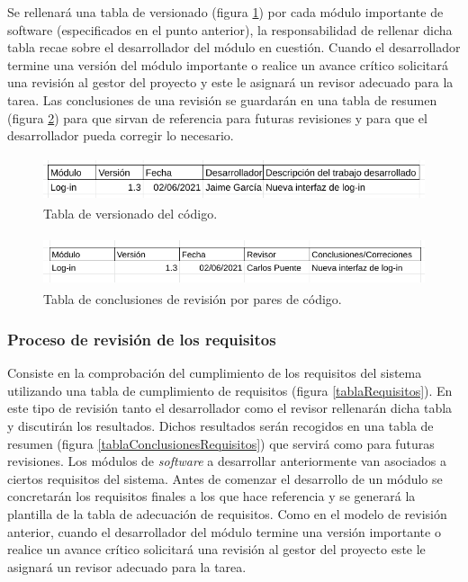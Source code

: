 \documentclass{article}
\begin{document}
Se rellenará una tabla de versionado (figura \ref{tablaVersionado}) por cada módulo importante de software (especificados en el punto anterior), la responsabilidad de rellenar dicha tabla recae sobre el desarrollador del módulo en cuestión. Cuando el desarrollador termine una versión del módulo importante o realice un avance crítico solicitará una revisión al gestor del proyecto y este le asignará un revisor adecuado para la tarea. Las conclusiones de una revisión se guardarán en una tabla de resumen (figura \ref{tablaConclusionesPares}) para que sirvan de referencia para futuras revisiones y para que el desarrollador pueda corregir lo necesario.

\begin{figure}[H]
   \centering
       \includegraphics[height=1.3cm]{../images/tabla_versionado_code.png}
   \caption{Tabla de versionado del código.}
   \label{tablaVersionado}
\end{figure}

\begin{figure}[H]
   \centering
       \includegraphics[height=1.5cm]{../images/tabla_conclusiones_revision_pares.png}
   \caption{Tabla de conclusiones de revisión por pares de código.}
   \label{tablaConclusionesPares}
\end{figure}

\subsubsection{Proceso de revisión de los requisitos} \label{P.EC.13}

Consiste en la comprobación del cumplimiento de los requisitos del sistema utilizando una tabla de cumplimiento de requisitos (figura \ref{tablaRequisitos}). En este tipo de revisión tanto el desarrollador como el revisor rellenarán dicha tabla y discutirán los resultados. Dichos resultados serán recogidos en una tabla de resumen (figura \ref{tablaConclusionesRequisitos}) que servirá como para futuras revisiones. Los módulos de \textit{software} a desarrollar anteriormente van asociados a ciertos requisitos del sistema. Antes de comenzar el desarrollo de un módulo se concretarán los requisitos finales a los que hace referencia y se generará la plantilla de la tabla de adecuación de requisitos. Como en el modelo de revisión anterior, cuando el desarrollador del módulo termine una versión importante o realice un avance crítico solicitará una revisión al gestor del proyecto este le asignará un revisor adecuado para la tarea.
\end{document}
